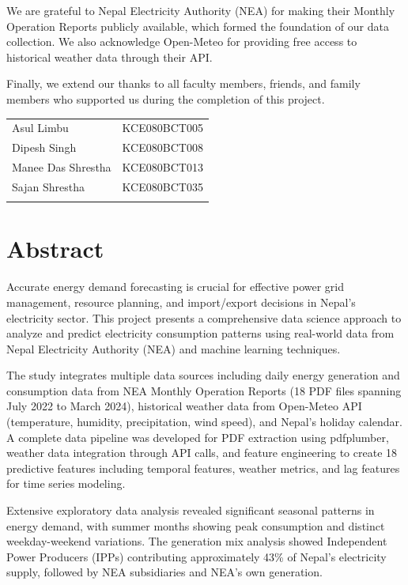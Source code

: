 			We are grateful to Nepal Electricity Authority (NEA) for making their Monthly Operation Reports publicly available, which formed the foundation of our data collection. We also acknowledge Open-Meteo for providing free access to historical weather data through their API.

			Finally, we extend our thanks to all faculty members, friends, and family members who supported us during the completion of this project.
			\vspace{1cm}

			\begin{tabular}{p{2in}p{3in}}
    			Asul Limbu & KCE080BCT005\\
    			Dipesh Singh & KCE080BCT008\\
    			Manee Das Shrestha & KCE080BCT013\\
    			Sajan Shrestha & KCE080BCT035\\
    		 \vspace{0.3in}
    		\end{tabular}
		\break

		\large
			\chapter*{Abstract}
		\normalsize
		Accurate energy demand forecasting is crucial for effective power grid management, resource planning, and import/export decisions in Nepal's electricity sector. This project presents a comprehensive data science approach to analyze and predict electricity consumption patterns using real-world data from Nepal Electricity Authority (NEA) and machine learning techniques.

		The study integrates multiple data sources including daily energy generation and consumption data from NEA Monthly Operation Reports (18 PDF files spanning July 2022 to March 2024), historical weather data from Open-Meteo API (temperature, humidity, precipitation, wind speed), and Nepal's holiday calendar. A complete data pipeline was developed for PDF extraction using pdfplumber, weather data integration through API calls, and feature engineering to create 18 predictive features including temporal features, weather metrics, and lag features for time series modeling.

		Extensive exploratory data analysis revealed significant seasonal patterns in energy demand, with summer months showing peak consumption and distinct weekday-weekend variations. The generation mix analysis showed Independent Power Producers (IPPs) contributing approximately 43\% of Nepal's electricity supply, followed by NEA subsidiaries and NEA's own generation.

